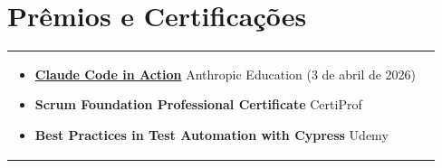 \documentclass[a4paper,8pt]{article}
\begin{document}
\section{Pr\^emios e Certifica\c{c}\~oes}
\begin{tabularx}{\linewidth}{ @{}l r@{} }
\begin{minipage}[t]{\linewidth}
    \begin{itemize}[nosep,after=\strut, leftmargin=2em, itemsep=2pt]
        \item \textbf{\href{https://verify.skilljar.com/c/b7pedaccpvjp}{Claude Code in Action}} Anthropic Education (3 de abril de 2026)
        \item \textbf{Scrum Foundation Professional Certificate} CertiProf
        \item \textbf{Best Practices in Test Automation with Cypress} Udemy
    \end{itemize}
    \end{minipage}
\end{tabularx}\\[3pt]
\end{document}
